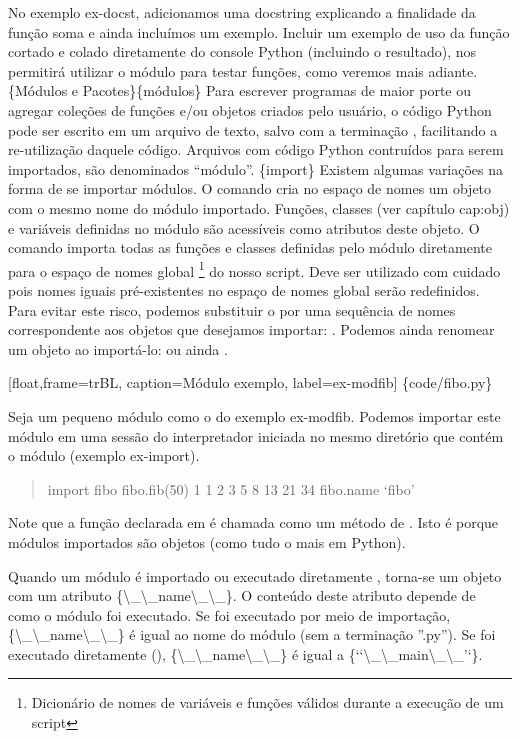 \documentclass[a4paper,10pt,portuguese]{sphinxmanual}
\begin{document}
No exemplo ex-docst, adicionamos uma docstring explicando a
finalidade da função soma e ainda incluímos um exemplo. Incluir um
exemplo de uso da função cortado e colado diretamente do console
Python (incluindo o resultado), nos permitirá utilizar o módulo
 para testar funções, como veremos mais adiante.
\{Módulos e Pacotes\}\{módulos\} Para escrever programas de maior porte
ou agregar coleções de funções e/ou objetos criados pelo usuário, o
código Python pode ser escrito em um arquivo de texto, salvo com a
terminação , facilitando a re-utilização daquele código.
Arquivos com código Python contruídos para serem importados, são
denominados ``módulo''. \{import\} Existem algumas variações na forma
de se importar módulos. O comando  cria no
espaço de nomes um objeto com o mesmo nome do módulo importado.
Funções, classes (ver capítulo cap:obj) e variáveis definidas no
módulo são acessíveis como atributos deste objeto. O comando
 importa todas as funções e classes
definidas pelo módulo diretamente para o espaço de nomes
global \footnote{
Dicionário de nomes de variáveis e funções válidos durante a
execução de um script
} do nosso script. Deve ser utilizado com cuidado pois
nomes iguais pré-existentes no espaço de nomes global serão
redefinidos. Para evitar este risco, podemos substituir o \code{*} por
uma sequência de nomes correspondente aos objetos que desejamos
importar: . Podemos ainda
renomear um objeto ao importá-lo:  ou ainda
.

{[}float,frame=trBL, caption=Módulo exemplo, label=ex-modfib{]} \{code/fibo.py\}

Seja um pequeno módulo como o do exemplo ex-modfib. Podemos
importar este módulo em uma sessão do interpretador iniciada no
mesmo diretório que contém o módulo (exemplo ex-import).
\begin{quote}

import fibo fibo.fib(50) 1 1 2 3 5 8 13 21 34 fibo.name `fibo'
\end{quote}

Note que a função declarada em  é chamada como um método
de . Isto é porque módulos importados são objetos (como
tudo o mais em Python).

Quando um módulo é importado ou executado diretamente , torna-se um
objeto com um atributo \{\textbackslash{}\_\textbackslash{}\_name\textbackslash{}\_\textbackslash{}\_\}. O conteúdo deste
atributo depende de como o módulo foi executado. Se foi executado
por meio de importação, \{\textbackslash{}\_\textbackslash{}\_name\textbackslash{}\_\textbackslash{}\_\} é igual ao nome do
módulo (sem a terminação ''.py''). Se foi executado diretamente
(), \{\textbackslash{}\_\textbackslash{}\_name\textbackslash{}\_\textbackslash{}\_\} é igual a
\{{}`{}`\textbackslash{}\_\textbackslash{}\_main\textbackslash{}\_\textbackslash{}\_'`\}.
\end{document}
